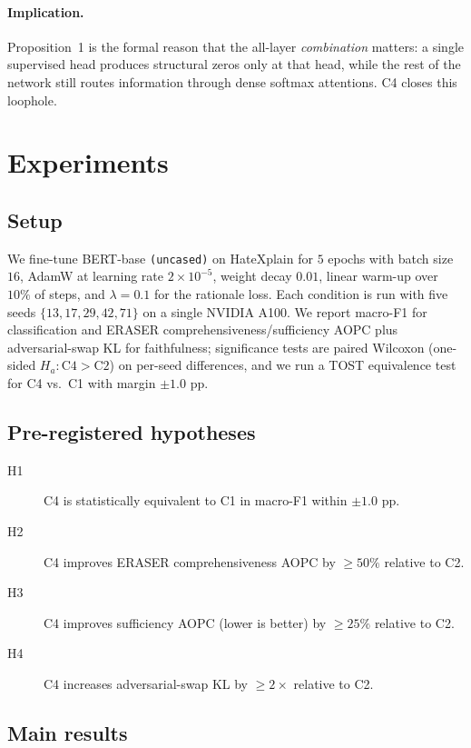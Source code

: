 \documentclass{article}
\begin{document}
\paragraph{Implication.} Proposition~1 is the formal reason that the all-layer
\emph{combination} matters: a single supervised head produces structural zeros only at
that head, while the rest of the network still routes information through dense softmax
attentions. C4 closes this loophole.

\section{Experiments}
\label{sec:experiments}

\subsection{Setup}
We fine-tune BERT-base \texttt{(uncased)} on HateXplain for $5$ epochs with batch size
$16$, AdamW at learning rate $2\times 10^{-5}$, weight decay $0.01$, linear warm-up over
$10\%$ of steps, and $\lambda{=}0.1$ for the rationale loss. Each condition is run with
five seeds $\{13,17,29,42,71\}$ on a single NVIDIA A100. We report macro-F1 for
classification and ERASER comprehensiveness/sufficiency AOPC plus adversarial-swap KL for
faithfulness; significance tests are paired Wilcoxon (one-sided $H_a: \mathrm{C4}{>}\mathrm{C2}$)
on per-seed differences, and we run a TOST equivalence test for C4 vs.\ C1 with margin
$\pm 1.0$ pp.

\subsection{Pre-registered hypotheses}
\begin{description}
\item[H1] C4 is statistically equivalent to C1 in macro-F1 within $\pm 1.0$ pp.
\item[H2] C4 improves ERASER comprehensiveness AOPC by $\geq 50\%$ relative to C2.
\item[H3] C4 improves sufficiency AOPC (lower is better) by $\geq 25\%$ relative to C2.
\item[H4] C4 increases adversarial-swap KL by $\geq 2{\times}$ relative to C2.
\end{description}

\subsection{Main results}
\end{document}
